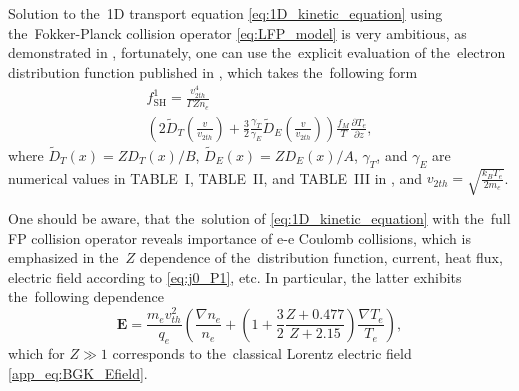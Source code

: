 \documentclass[
 aps,
 jmp,
 amsmath,amssymb,
 twocolumn,
]{revtex4-1}
\newcommand{\pdv}[2]{\frac{\partial{#1}}{\partial{#2}}}
\newcommand{\vect}[1]{\boldsymbol{#1}}
\newcommand{\Zbar}{Z}
\newcommand{\vmag}{v}
\newcommand{\vth}{v_{th}}
\newcommand{\vtwoh}{v_{2 th}}
\newcommand{\E}{\vect{E}}
\newcommand{\qe}{q_e}
\newcommand{\me}{m_e}
\newcommand{\kB}{k_B}
\newcommand{\fM}{f_M}
\newcommand{\ft}{f}
\begin{document}
Solution to the~1D transport equation \eqref{eq:1D_kinetic_equation}
using the~Fokker-Planck collision operator \eqref{eq:LFP_model}
is very ambitious, as demonstrated in 
\cite{Chandrasekhar_RMP1943, CSR_1950, Rosenbluth_PR1957}, fortunately, one 
can use the~explicit evaluation of the~electron distribution function
published in \cite{SpitzerHarm_PR1953}, which takes the~following form
\begin{multline}
  \ft^1_{\text{SH}} =
  \frac{\vtwoh^4}{\Gamma\Zbar n_e}\\
  \left( 2\tilde{D}_T\left(\frac{\vmag}{\vtwoh}\right) 
  + \frac{3}{2}\frac{\gamma_T}{\gamma_E} 
  \tilde{D}_E\left(\frac{\vmag}{\vtwoh}\right) \right)%
  \frac{\fM}{T}\pdv{T_e}{z}  ,
  \label{eq:f1_SH}
\end{multline}
where $\tilde{D}_T(x) = \Zbar D_{T}(x) / B$, 
$\tilde{D}_E(x) = \Zbar D_{E}(x) / A$, $\gamma_T$,
and $\gamma_E$ are numerical values in TABLE~I, TABLE~II, and
TABLE~III in \cite{SpitzerHarm_PR1953}, and 
$\vtwoh = \sqrt{\frac{\kB T_e}{2\me}}$.

One should be aware, that the~solution of \eqref{eq:1D_kinetic_equation}
with the~full FP collision operator reveals importance of
e-e Coulomb collisions, which is emphasized in the~$\Zbar$ dependence 
of the~distribution function, current, heat flux, 
electric field according to \eqref{eq:j0_P1}, etc.
In particular, the latter exhibits the~following dependence 
\cite{SpitzerHarm_PR1953}
\begin{equation}
  \E = \frac{\me \vth^2}{\qe}
  \left(\frac{\nabla n_e}{n_e} + 
  \left(1 + \frac{3}{2}\frac{\Zbar + 0.477}{\Zbar + 2.15} \right)
  \frac{\nabla T_e}{T_e} \right),
  \label{eq:SH_Efield} 
\end{equation}
which for $\Zbar\gg1$ corresponds to the~classical Lorentz electric field 
\eqref{app_eq:BGK_Efield}.
\end{document}
